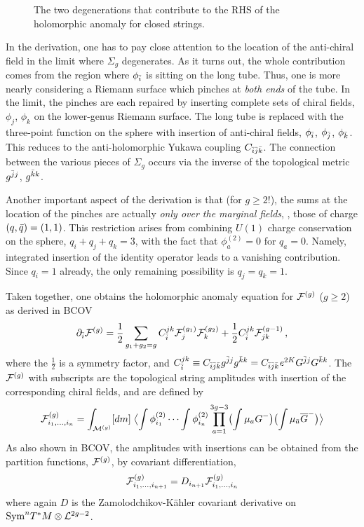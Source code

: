 \begin{figure}[t]
\qquad
{}
\caption{The two degenerations that contribute to the RHS of the
holomorphic anomaly for closed strings.}
\label{degenbcov}
\end{figure}

In the derivation, one has to pay close attention to the location of
the anti-chiral field in the limit where $\Sigma_g$ degenerates. As 
it turns out, the whole contribution comes from the region where 
$\phi_{\bar i}$ is sitting on the long tube. Thus, one is more nearly 
considering a Riemann surface which pinches at {\it both ends} 
of the tube. In the limit, the pinches are each repaired by inserting
complete sets of chiral fields, $\phi_j$, $\phi_k$ on the lower-genus
Riemann surface. The long tube is replaced with the three-point function 
on the sphere with insertion of anti-chiral fields, $\phi_{\bar i}$, $\phi_{\bar j}$, 
$\phi_{\bar k}$. This reduces to the anti-holomorphic Yukawa coupling 
$C_{{\bar i}{\bar j}{\bar k}}$. The connection between the various pieces of $\Sigma_g$
occurs via the inverse of the topological metric $g^{{\bar j} j}$, $g^{{\bar k} k}$.

Another important aspect of the derivation is that (for $g\ge 2$!), the
sums at the location of the pinches are actually {\it only over the
marginal fields}, \ie, those of charge $(q,{\bar q})=(1,1)$. This restriction
arises from combining $U(1)$ charge conservation on the sphere, $q_i+q_j+
q_k=3$, with the fact that $\phi_a^{(2)}=0$ for $q_a=0$. Namely,
integrated insertion of the identity operator leads to a vanishing
contribution. Since $q_i=1$ already, the only remaining possibility is 
$q_j=q_k=1$.

Taken together, one obtains the holomorphic anomaly equation for ${{\cal F}}^{(g)}$ 
($g\ge 2$) as derived in BCOV 
\begin{equation}
\eqlabel{bcov}
\del_\ib \Fc g = \frac 12 \sum_{g_1+g_2=g} C_{\ib}^{jk}
\Fc {g_1}_j \Fc {g_2}_k + \frac 12
C_{\ib}^{jk} \Fc {g-1}_{jk} \,,
\end{equation}
where the $\frac 12$ is a symmetry factor, and $C_{\bar i}^{jk}\equiv
C_{{\bar i}{\bar j}{\bar k}} g^{{\bar j} j} g^{{\bar k} k}= C_{{\bar i}{\bar j}{\bar k}}{\it e}^{2K} G^{{\bar j} j} 
G^{{\bar k} k}$. The ${{\cal F}}^{(g)}$ with subscripts are the topological string 
amplitudes with insertion of the corresponding chiral fields, and
are defined by
\begin{equation}
{{\cal F}}^{(g)}_{i_1,\ldots, i_n} = \int_{{\cal M}^{(g)}} [dm]\;
\bigl\langle
\int \phi_{i_1}^{(2)} \cdots \int \phi_{i_n}^{(2)}
\prod_{a=1}^{3g-3} 
\bigl(\int \mu_a G^-\bigr)
\bigl(\int \mu_{\bar a} {\overline G}^-\bigr)
\bigr\rangle
\end{equation} 
As also shown in BCOV, the amplitudes with insertions can be obtained from 
the partition functions, ${{\cal F}}^{(g)}$, by covariant differentiation,
\begin{equation}
{{\cal F}}^{(g)}_{i_1,\ldots,i_{n+1}} = D_{i_{n+1}} {{\cal F}}^{(g)}_{i_1,\ldots,i_n}
\end{equation}
where again $D$ is the Zamolodchikov-K\"ahler covariant derivative on 
${\rm Sym}^n T^*M\otimes{\cal L}^{2g-2}$.

